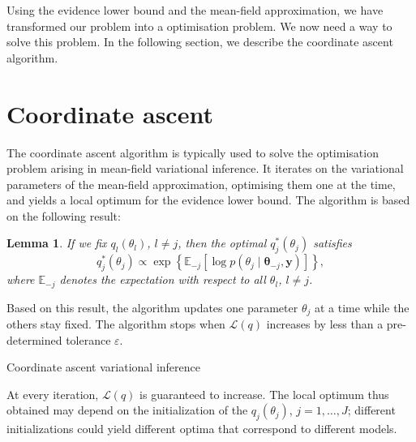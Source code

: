 \documentclass[a4paper, 11pt]{report}
\numberwithin{equation}{chapter}
\newtheorem{lemma}{Lemma}[chapter]
\begin{document}
Using the evidence lower bound and the mean-field approximation, we have transformed our problem into a optimisation problem. We now need a way to solve this problem. In the following section, we describe the coordinate ascent algorithm.
\section{Coordinate ascent}
The coordinate ascent algorithm is typically used to solve the optimisation problem arising in mean-field variational inference. It iterates on the variational parameters of the mean-field approximation, optimising them one at the time, and yields a local optimum for the evidence lower bound. The algorithm is based on the following result:
\begin{lemma}

If we fix $q_l(\theta_l)$, $l\neq j$, then the optimal $q^*_j(\theta_j)$ satisfies
\begin{equation*}
q^*_j(\theta_j) \propto \exp\left\lbrace\mathbb{E}_{-j}\left[\log p(\theta_j \mid \boldsymbol{\theta}_{-j}, \boldsymbol{y})\right]\right\rbrace,
\end{equation*}
where $\mathbb{E}_{-j}$ denotes the expectation with respect to all $\theta_l$, $l \neq j$.
\end{lemma}

Based on this result, the algorithm updates one parameter $\theta_j$ at a time while the others stay fixed. The algorithm stops when $\mathcal{L}(q)$ increases by less than a pre-determined tolerance $\varepsilon$.

\begin{algorithm}
\BlankLine
{}
\BlankLine
{}
\BlankLine
{}
\caption{\label{alg:CAVI}Coordinate ascent variational inference}
\end{algorithm}
At every iteration, $\mathcal{L}(q)$ is guaranteed to increase. The local optimum thus obtained may depend on the initialization of the $q_j(\theta_j)$, $j=1,\ldots,J$; different initializations could yield different optima that correspond to different models.
\end{document}
